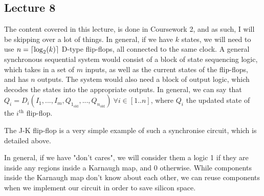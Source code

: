 \documentclass[a4paper, 12pt]{article}
\DeclarePairedDelimiter{\ceil}{\lceil}{\rceil}
\begin{document}
        \subsection*{Lecture 8}
            The content covered in this lecture, is done in Coursework 2, and as such, I will be skipping over a lot of things. In general, if we have $k$ states, we will need to use $n = \ceil{\mathrm{log}_2(k)}$ D-type flip-flops, all connected to the same clock. A general synchronous sequential system would consist of a block of state sequencing logic, which takes in a set of $m$ inputs, as well as the current states of the flip-flops, and has $n$ outputs. The system would also need a block of output logic, which decodes the states into the appropriate outputs. In general, we can say that $Q_i = D_i(I_1, ..., I_m, Q_{1_\text{old}}, ..., Q_{n_\text{old}})\ \forall i \in [1..n]$, where $Q_i$ the updated state of the $i^\text{th}$ flip-flop.
            \medskip

            The J-K flip-flop is a very simple example of such a synchronise circuit, which is detailed above.
            \medskip

            In general, if we have "don't cares", we will consider them a logic 1 if they are inside any regions inside a Karnaugh map, and 0 otherwise. While components inside the Karnaugh map don't know about each other, we can reuse components when we implement our circuit in order to save silicon space.
\end{document}
